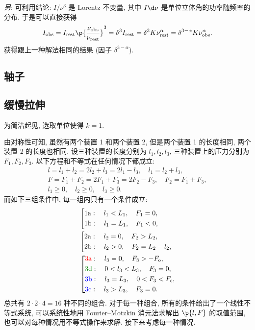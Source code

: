 \documentclass{article}
\newcommand{\mrm}[1]{\mathrm{#1}}
\newcommand{\tit}[1]{\textit{#1}}
\newcommand{\alp}{\alpha}
\newcommand{\dlt}{\delta}
\newcommand{\fr}{\frac}
\begin{document}
\tit{另}: 可利用结论: $I/\nu^3$ 是 Lorentz 不变量, 其中 $I\d\nu$ 是单位立体角的功率随频率的分布.
于是可以直接获得
\[I_\mrm{obs}=I_\mrm{rest}\p{\fr{\nu_\mrm{obs}}{\nu_\mrm{rest}}}^3
=\dlt^3I_\mrm{rest}=\dlt^3K\nu_\mrm{rest}^\alp=\dlt^{3-\alp}K\nu_\mrm{obs}^\alp.\]
获得跟上一种解法相同的结果 (因子 $\dlt^{3-\alp}$).

\subsection{轴子}

\subsection{缓慢拉伸}

为简洁起见, 选取单位使得 $k=1$.

由对称性可知, 虽然有两个装置 1 和两个装置 2,
但是两个装置 1 的长度相同, 两个装置 2 的长度也相同.
设三种装置的长度分别为 $l_1,l_2,l_3$,
三种装置上的压力分别为 $F_1,F_2,F_3$.
以下方程和不等式在任何情况下都成立:
\begin{gather*}
	l=l_1+l_2=2l_2+l_3=2l_1-l_3,\quad l_1=l_2+l_3,\\
	F=F_1+F_2=2F_1+F_3=2F_2-F_3,\quad F_2=F_1+F_3,\\
	l_1\ge0,\quad l_2\ge0,\quad l_3\ge0.
\end{gather*}
而如下三组条件中, 每一组内只有一个条件成立:
\begin{align*}
	&\left[\begin{aligned}
		&\mrm{1a}:\quad l_1<L_1,\quad F_1=0,\\
		&\mrm{1b}:\quad l_1=L_1,\quad F_1<0,
	\end{aligned}\right.\\
	&\left[\begin{aligned}
		&\mrm{2a}:\quad l_2=0,\quad F_2>L_2,\\
		&\mrm{2b}:\quad l_2>0,\quad F_2=L_2-l_2,\\
	\end{aligned}\right.\\
	&\left[\begin{aligned}
		&\mrm{\color{red}3a}:\quad l_3=0,\quad F_3>-F_\mrm o,\\
		&\mrm{\color{green!50!black}3d}:\quad 0<l_3<L_3,\quad F_3=0,\\
		&\mrm{\color{blue}3b}:\quad l_3=L_3,\quad 0<F_3<F_\mrm c,\\
		&\mrm{\color{blue}3c}:\quad l_3>L_3,\quad F_3=0.
	\end{aligned}\right.
\end{align*}
总共有 $2\cdot2\cdot4=16$ 种不同的组合.
对于每一种组合, 所有的条件给出了一个线性不等式系统,
可以系统性地用 Fourier--Motzkin 消元法求解出 $\p{l,F}$ 的取值范围,
也可以对每种情况用不等式操作来求解.
接下来考虑每一种情况.
\end{document}
